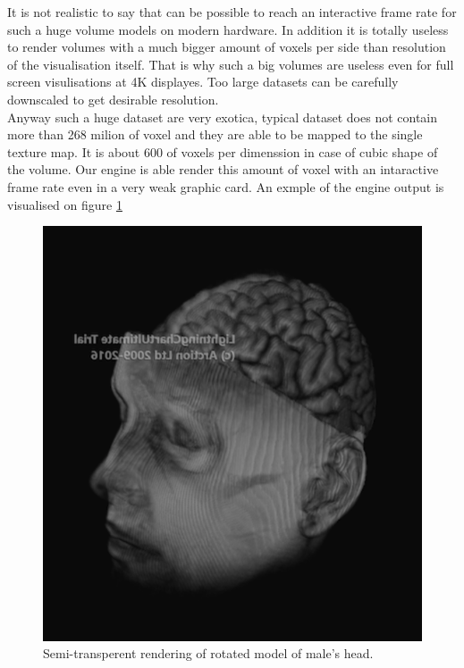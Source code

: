 \documentclass[twoside, english, 11pt]{report}
\begin{document}
It is not realistic to say that can be possible to reach an interactive frame rate for such a huge volume models on modern hardware. In addition it is totally useless to render volumes with a much bigger amount of voxels per side than resolution of the visualisation itself. That is why such a big volumes are useless even for full screen visulisations at 4K displayes. Too large datasets can be carefully downscaled to get desirable resolution.\\

Anyway such a huge dataset are very exotica, typical dataset does not contain more than 268 milion of voxel and they are able to be mapped to the single texture map. It is about 600 of voxels per dimenssion in case of cubic shape of the volume. Our engine is able render this amount of voxel with an intaractive frame rate even in a very weak graphic card. An exmple of the engine output is visualised on figure \ref{fig:head}\\

\begin{figure}[H]
\centerline{\includegraphics[scale = 0.6]{img/head}}
\caption{Semi-transperent rendering of rotated model of male's head.\label{fig:head}}
\end{figure}
\end{document}
